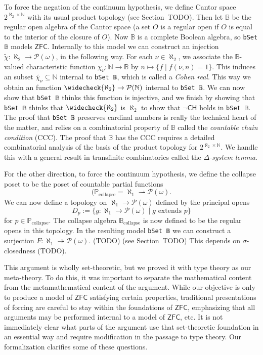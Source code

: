 \documentclass[sigplan,10pt,review, autoref,anonymous]{acmart}
\newcommand{\B}{\mathbb{B}}
\newcommand{\lil}{\lstinline}
\newcommand{\ZFC}{\mathsf{ZFC}}
\newcommand{\CH}{\mathsf{CH}}
\theoremstyle{definition}
\begin{document}
To force the negation of the continuum hypothesis, we define Cantor space $2^{\aleph_2 \times \mathbb{N}}$ with its usual product topology (see Section~TODO).
Then let $\B$ be the regular open algebra of the Cantor space (a set $O$ is a regular open if $O$ is equal to the interior of the closure of $O$).
Now $\B$ is a complete Boolean algebra, so \lil{bSet 𝔹} models $\ZFC$.
Internally to this model we can construct an injection $\widetilde{\chi} : \aleph_2 \to \mathcal{P}(\omega)$, in the following way.
For each $\nu \in \aleph_2$, we associate the $\B$-valued characteristic function $\chi_\nu : \mathbb{N} \to \B$ by $n \mapsto \{f \mid f(\nu, n) = 1\}$.
This induces an subset $\widetilde{\chi_{\nu}} \subseteq \mathbb{N}$ internal to \lil{bSet 𝔹}, which is called a \emph{Cohen real}.
This way we obtain an function \(\widecheck{\aleph_2} \to \mathcal{P}(\mathbb{N})\) internal to \lil{bSet 𝔹}.
We can now show that \lil{bSet 𝔹} thinks this function is injective, and we finish by showing that \lil{bSet 𝔹} thinks that \(\widecheck{\aleph_2}\) is $\aleph_2$ to show that $\neg\CH$ holds in \lil{bSet 𝔹}.
The proof that \lil{bSet 𝔹} preserves cardinal numbers is really the technical heart of the matter, and relies on a combinatorial property of $\B$ called the \emph{countable chain condition} (CCC).
The proof that $\B$ has the CCC requires a detailed combinatorial analysis of the basis of the product topology for $2^{\aleph_2 \times \mathbb{N}}$.
We handle this with a general result in transfinite combinatorics called the \emph{$\Delta$-system lemma}.

For the other direction, to force the continuum hypothesis, we define the collapse poset to be the poset of countable partial functions
\[(\mathbb{P}_{\text{collapse}} = \aleph_1 \rightharpoonup \mathcal{P}(\omega).\]
We can now define a topology on $\aleph_1 \to \mathcal{P}(\omega)$ defined by the principal opens
\[D_p := \{g : \aleph_1 \to \mathcal{P}(\omega) \mid g \text{ extends } p\} \]
for $p \in \mathbb{P}_{\text{collapse}}$.
The collapse algebra $\mathbb{B}_{\text{collapse}}$ is now defined to be the regular opens in this topology.
In the resulting model \lil{bSet 𝔹} we can construct a surjection \(F : \aleph_1 \twoheadrightarrow \mathcal{P}(\omega)\). (TODO) (see Section~TODO)
This depends on \(\sigma\)-closedness (TODO).

This argument is wholly set-theoretic, but we proved it with type theory as our meta-theory.
To do this, it was important to separate the mathematical content from the metamathematical content of the argument.
While our objective is only to produce a model of $\mathsf{ZFC}$ satisfying certain properties, traditional presentations of forcing are careful to stay within the foundations of $\mathsf{ZFC}$, emphasizing that all arguments may be performed internal to a model of $\mathsf{ZFC}$, etc.
It is not immediately clear what parts of the argument use that set-theoretic foundation in an essential way and require modification in the passage to type theory.
Our formalization clarifies some of these questions.
\end{document}

